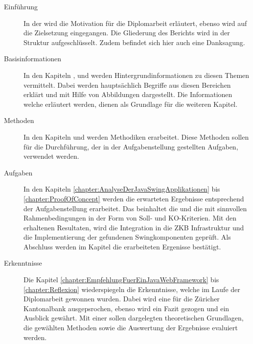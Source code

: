   \begin{description}
    
  \item[Einführung]
  
  In der  wird die Motivation für die Diplomarbeit
  erläutert, ebenso wird auf die Zielsetzung eingegangen. Die Gliederung des
  Berichts wird in der Struktur aufgeschlüsselt. Zudem befindet sich hier auch
  eine Danksagung.
  
  \item[Basisinformationen]
    
  In den Kapiteln 
  , 
   und
   werden
  Hintergrundinformationen zu diesen Themen vermittelt. Dabei werden
  hauptsächlich Begriffe aus diesen Bereichen erklärt und mit Hilfe von
  Abbildungen dargestellt. Die Informationen welche erläutert werden, dienen
  als Grundlage für die weiteren Kapitel.

  \item[Methoden]
  
  In den Kapiteln 
  und  werden
  Methodiken erarbeitet. Diese Methoden sollen für die Durchführung, der in der
  Aufgabenstellung gestellten Aufgaben, verwendet werden.
  
  \item[Aufgaben]
  
  In den Kapiteln \ref{chapter:AnalyseDerJavaSwingApplikationen} bis
  \ref{chapter:ProofOfConcept} werden die erwarteten Ergebnisse
  entsprechend der Aufgabenstellung erarbeitet. Das beinhaltet die
   und die
   mit sinnvollen
  Rahmenbedingungen in der Form von Soll- und KO-Kriterien. Mit den erhaltenen
  Resultaten, wird die Integration in die ZKB Infrastruktur und die
  Implementierung der gefundenen Swingkomponenten geprüft. Als Abschluss werden
  im Kapitel  die erarbeiteten Ergenisse
  bestätigt.
  
  \item[Erkenntnisse]
  
  Die Kapitel \ref{chapter:EmpfehlungFuerEinJavaWebFramework} bis
  \ref{chapter:Reflexion} wiederspiegeln die Erkenntnisse, welche im Laufe
  der Diplomarbeit gewonnen wurden. Dabei wird eine
   für die Züricher
  Kantonalbank ausgepsrochen, ebenso wird ein Fazit gezogen und ein Ausblick
  gewährt. Mit einer  sollen dargelegten
  theoretischen Grundlagen, die gewählten Methoden sowie die Auswertung der
  Ergebnisse evaluiert werden.
  

\end{description}
